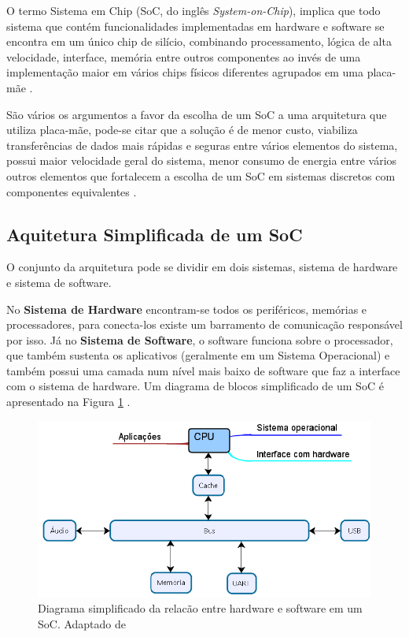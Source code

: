 O termo Sistema em Chip (SoC, do inglês \textit{System-on-Chip}), implica que todo sistema que contém funcionalidades implementadas em hardware e software se encontra em um único chip de silício, combinando processamento, lógica de alta velocidade, interface, memória entre outros componentes ao invés de uma implementação maior em vários chips físicos diferentes agrupados em uma placa-mãe \cite{zynqBook}.

São vários os argumentos a favor da escolha de um SoC a uma arquitetura que utiliza placa-mãe, pode-se citar que a solução é de menor custo, viabiliza transferências de dados mais rápidas e seguras entre vários elementos do sistema, possui maior velocidade geral do sistema, menor consumo de energia entre vários outros elementos que fortalecem a escolha de um SoC em sistemas discretos com componentes equivalentes \cite{zynqBook}.

\subsection{Aquitetura Simplificada de um SoC}

O conjunto da arquitetura pode se dividir em dois sistemas, sistema de hardware  e sistema de software. 


No \textbf{Sistema de Hardware} encontram-se todos os periféricos, memórias e processadores, para conecta-los existe um barramento de comunicação responsável por isso. Já no \textbf{Sistema de Software}, o software funciona sobre o processador, que também sustenta os aplicativos (geralmente em um Sistema Operacional)  e também possui uma camada num nível mais baixo de software que 
faz a interface com o sistema de hardware. Um diagrama de blocos simplificado de um SoC é apresentado na Figura \ref{diagram SoC} \cite{zynqBook}.


\begin{figure}[h]
	\centering
	\includegraphics[keepaspectratio=true,scale=0.5]{figuras/diaagrama-soc.png}
	\caption{Diagrama simplificado da relacão entre hardware e software em um SoC. Adaptado de \cite{cao2017post}}
	\label{diagram SoC}
\end{figure}


